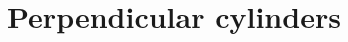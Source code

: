 \documentclass[onecolumn,letterpaper,amsmath,amssymb,floatfix,aps,superscriptaddress]{revtex4}
\begin{document}
%
%

\section{Perpendicular cylinders}
\end{document}
